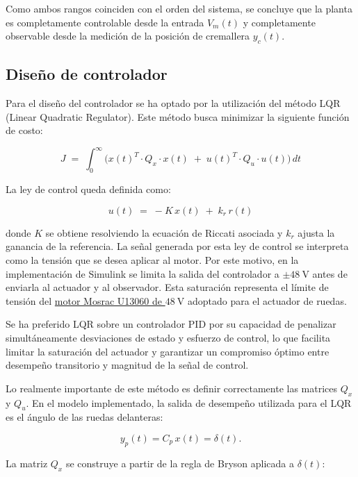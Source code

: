 \documentclass{article}
\begin{document}
Como ambos rangos coinciden con el orden del sistema, se concluye que la planta es completamente controlable desde la entrada $V_m(t)$ y completamente observable desde la medición de la posición de cremallera $y_c(t)$.

\subsection{Diseño de controlador}

Para el diseño del controlador se ha optado por la utilización del método LQR (Linear Quadratic Regulator). Este método busca minimizar la siguiente función de costo:

\begin{equation}
J \;=\; \int_{0}^{\infty}\bigl(x(t)^{T}\cdot Q_x \cdot x(t)\;+\;u(t)^{T} \cdot Q_u \cdot u(t)\bigr)\,dt
\end{equation}

La ley de control queda definida como:

\begin{equation}
u(t)\;=\;-K\,x(t)\;+\;k_{r}\,r(t)
\end{equation}

donde $K$ se obtiene resolviendo la ecuación de Riccati asociada y $k_{r}$ ajusta la ganancia de la referencia. La señal generada por esta ley de control se interpreta como la tensión que se desea aplicar al motor. Por este motivo, en la implementación de Simulink se limita la salida del controlador a $\pm48\ \mathrm{V}$ antes de enviarla al actuador y al observador. Esta saturación representa el límite de tensión del \hyperlink{ref:mosrac-u13060}{motor Mosrac U13060 de $48\ \mathrm{V}$} adoptado para el actuador de ruedas.

Se ha preferido LQR sobre un controlador PID por su capacidad de penalizar simultáneamente desviaciones de estado y esfuerzo de control, lo que facilita limitar la saturación del actuador y garantizar un compromiso óptimo entre desempeño transitorio y magnitud de la señal de control.

Lo realmente importante de este método es definir correctamente las matrices $Q_x$ y $Q_u$. En el modelo implementado, la salida de desempeño utilizada para el LQR es el ángulo de las ruedas delanteras:

\begin{equation}
y_p(t)=C_p\,x(t)=\delta(t).
\end{equation}

 La matriz $Q_x$ se construye a partir de la regla de Bryson aplicada a $\delta(t)$:
\end{document}
